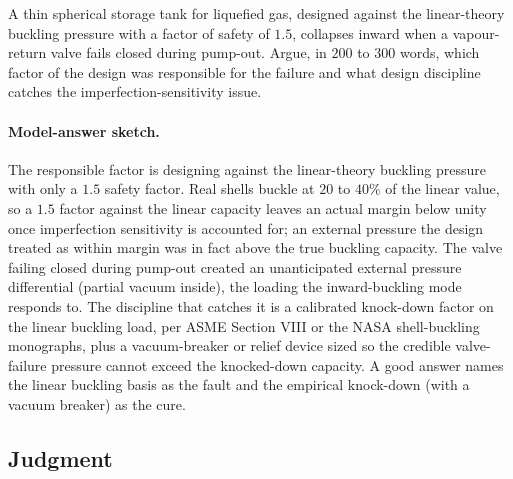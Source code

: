 \begin{exercise}
A thin spherical storage tank for liquefied gas, designed against
the linear-theory buckling pressure with a factor of safety of
$1.5$, collapses inward when a vapour-return valve fails closed
during pump-out. Argue, in $200$ to $300$ words, which factor of
the design was responsible for the failure and what design
discipline catches the imperfection-sensitivity issue.

\paragraph{Model-answer sketch.} The responsible factor is designing
against the linear-theory buckling pressure with only a $1.5$ safety
factor. Real shells buckle at $20$ to $40\%$ of the linear value, so a
$1.5$ factor against the linear capacity leaves an actual margin below
unity once imperfection sensitivity is accounted for; an external
pressure the design treated as within margin was in fact above the true
buckling capacity. The valve failing closed during pump-out created an
unanticipated external pressure differential (partial vacuum inside),
the loading the inward-buckling mode responds to. The discipline that
catches it is a calibrated knock-down factor on the linear buckling
load, per ASME Section VIII or the NASA shell-buckling monographs, plus
a vacuum-breaker or relief device sized so the credible valve-failure
pressure cannot exceed the knocked-down capacity. A good answer names
the linear buckling basis as the fault and the empirical knock-down
(with a vacuum breaker) as the cure.
\end{exercise}

\subsection*{Judgment}

